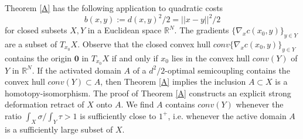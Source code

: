 \documentclass[12pt]{amsart}
\theoremstyle{definition}
\theoremstyle{remark}
\newcommand{\bR}{\mathbb{R}}
\newcommand{\del}{\partial}
\newcommand{\sub}{\del^c \psi^c(x')}
\begin{document}







Theorem \ref{A} has the following application to quadratic costs \begin{equation}\label{bqc} b(x,y):=d(x,y)^2/2=||x-y||^2/2\end{equation} for closed subsets $X,Y$ in a Euclidean space $\bR^N$. The gradients $\{\nabla_x c(x_0,y)\}_{y \in Y}$ are a subset of $T_{x_0} X$. Observe that the closed convex hull $conv\{\nabla_x c(x_0,y)\}_{y \in Y}$ contains the origin $\textbf{0}$ in $T_{x_0} X$ if and only if $x_0$ lies in the convex hull $conv(Y)$ of $Y$ in $\bR^N$. If the activated domain $A$ of a $d^2/2$-optimal semicoupling contains the convex hull $conv(Y) \subset A$, then Theorem \ref{A} implies the inclusion $A\subset X$ is a homotopy-isomorphism. The proof of Theorem \ref{A} constructs an explicit strong deformation retract of $X$ onto $A$.  We find $A$ contains $conv(Y)$ whenever the ratio $\int_X \sigma / \int_Y \tau>1$ is sufficiently close to $1^+$, i.e. whenever the active domain $A$ is a sufficiently large subset of $X$. 
\end{document}
